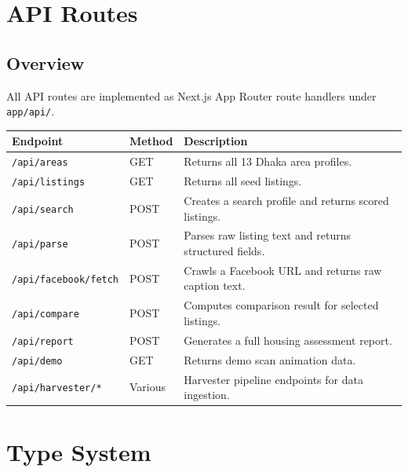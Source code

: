 \documentclass[12pt, a4paper, oneside]{report}
\newcommand{\filepath}[1]{\texttt{\small\color{codeblue}#1}}
\begin{document}
\chapter{API Routes}

\section{Overview}

All API routes are implemented as Next.js App Router route handlers under \filepath{app/api/}.

\begin{longtable}{p{5cm} p{2cm} p{6cm}}
\toprule
\textbf{Endpoint} & \textbf{Method} & \textbf{Description} \\
\midrule
\endhead
\texttt{/api/areas} & GET & Returns all 13 Dhaka area profiles. \\
\midrule
\texttt{/api/listings} & GET & Returns all seed listings. \\
\midrule
\texttt{/api/search} & POST & Creates a search profile and returns scored listings. \\
\midrule
\texttt{/api/parse} & POST & Parses raw listing text and returns structured fields. \\
\midrule
\texttt{/api/facebook/fetch} & POST & Crawls a Facebook URL and returns raw caption text. \\
\midrule
\texttt{/api/compare} & POST & Computes comparison result for selected listings. \\
\midrule
\texttt{/api/report} & POST & Generates a full housing assessment report. \\
\midrule
\texttt{/api/demo} & GET & Returns demo scan animation data. \\
\midrule
\texttt{/api/harvester/*} & Various & Harvester pipeline endpoints for data ingestion. \\
\bottomrule
\end{longtable}


\chapter{Type System}
\end{document}
